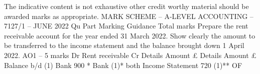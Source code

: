 \documentclass{article}
\begin{document}
 \newline
The indicative content is not exhaustive other credit worthy material should be awarded marks as \newline
appropriate. \newline
 \newline
 \newline
 \newline
MARK SCHEME – A-LEVEL ACCOUNTING – 7127/1 – JUNE 2022  \newline
Qu \newline
Part \newline
Marking Guidance \newline
Total \newline
marks  \newline
 \newline
Prepare the rent receivable account for the year ended 31 March 2022.   \newline
Show clearly the amount to be transferred to the income statement and the \newline
balance brought down 1 April 2022.   \newline
 \newline
AO1 – 5 marks \newline
 \newline
Dr \newline
Rent receivable \newline
Cr \newline
Details \newline
Amount \newline
 £ \newline
Details \newline
Amount \newline
 £ \newline
Balance b/d  (1) \newline
Bank  900 * \newline
Bank  (1)* both  \newline
    \newline
Income Statement  720 (1)** OF \newline
 \newline
    \newline
\end{document}
